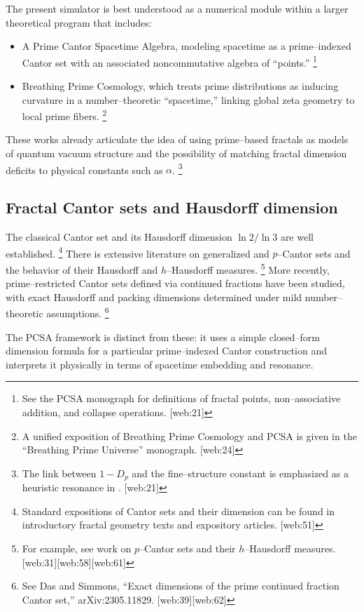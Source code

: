 \documentclass[11pt]{article}
\begin{document}
The present simulator is best understood as a numerical module within a larger theoretical program that includes:
\begin{itemize}
  \item A Prime Cantor Spacetime Algebra, modeling spacetime as a prime--indexed Cantor set with an associated noncommutative algebra of ``points.''%
  \footnote{See the PCSA monograph for definitions of fractal points, non--associative addition, and collapse operations. [web:21]} 
  \item Breathing Prime Cosmology, which treats prime distributions as inducing curvature in a number--theoretic ``spacetime,'' linking global zeta geometry to local prime fibers.%
  \footnote{A unified exposition of Breathing Prime Cosmology and PCSA is given in the ``Breathing Prime Universe'' monograph. [web:24]} 
\end{itemize}
These works already articulate the idea of using prime--based fractals as models of quantum vacuum structure and the possibility of matching fractal dimension deficits to physical constants such as $\alpha$.%
\footnote{The link between $1-D_p$ and the fine--structure constant is emphasized as a heuristic resonance in \cite{pcsa_gist}. [web:21]} 

\subsection{Fractal Cantor sets and Hausdorff dimension}

The classical Cantor set and its Hausdorff dimension $\ln 2/\ln 3$ are well established.%
\footnote{Standard expositions of Cantor sets and their dimension can be found in introductory fractal geometry texts and expository articles. [web:51]} 
There is extensive literature on generalized and $p$--Cantor sets and the behavior of their Hausdorff and $h$--Hausdorff measures.%
\footnote{For example, see work on $p$--Cantor sets and their $h$--Hausdorff measures. [web:31][web:58][web:61]} 
More recently, prime--restricted Cantor sets defined via continued fractions have been studied, with exact Hausdorff and packing dimensions determined under mild number--theoretic assumptions.%
\footnote{See Das and Simmons, ``Exact dimensions of the prime continued fraction Cantor set,'' arXiv:2305.11829. [web:39][web:62]} 

The PCSA framework is distinct from these: it uses a simple closed--form dimension formula for a particular prime--indexed Cantor construction and interprets it physically in terms of spacetime embedding and resonance.
\end{document}
